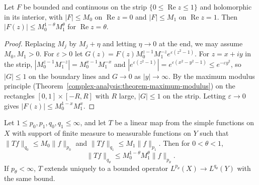\begin{lemma}\label{harmonic-analysis:lemma-three-lines}
Let $F$ be bounded and continuous on the strip $\{0 \leq \operatorname{Re}z \leq 1\}$ and holomorphic in its interior, with $|F| \leq M_0$ on $\operatorname{Re}z = 0$ and $|F| \leq M_1$ on $\operatorname{Re}z = 1$. Then
$|F(z)| \leq M_0^{1-\theta}M_1^\theta$ for $\operatorname{Re}z = \theta$.
\end{lemma}

\begin{proof}
Replacing $M_j$ by $M_j + \eta$ and letting $\eta \to 0$ at the end, we may assume $M_0, M_1 > 0$. For $\varepsilon > 0$ let $G(z) = F(z)M_0^{z-1}M_1^{-z}e^{\varepsilon(z^2 - 1)}$. For $z = x + iy$ in the strip,
$|M_0^{z-1}M_1^{-z}| = M_0^{x-1}M_1^{-x}$ and $|e^{\varepsilon(z^2 - 1)}| = e^{\varepsilon(x^2 - y^2 - 1)} \leq e^{-\varepsilon y^2}$, so $|G| \leq 1$ on the boundary lines and $G \to 0$ as $|y| \to \infty$. By the maximum
modulus principle (Theorem~\ref{complex-analysis:theorem-maximum-modulus}) on the rectangles $[0, 1] \times [-R, R]$ with $R$ large, $|G| \leq 1$ on the strip. Letting $\varepsilon \to 0$ gives
$|F(z)| \leq M_0^{1-x}M_1^x$.
\end{proof}

\begin{theorem}\label{harmonic-analysis:theorem-riesz-thorin}
Let $1 \leq p_0, p_1, q_0, q_1 \leq \infty$, and let $T$ be a linear map from the simple functions on $X$ with support of finite measure to measurable functions on $Y$ such that
$\|Tf\|_{q_0} \leq M_0\|f\|_{p_0}$ and $\|Tf\|_{q_1} \leq M_1\|f\|_{p_1}$. Then for $0 < \theta < 1$,
\[
\|Tf\|_{q_\theta} \leq M_0^{1-\theta}M_1^\theta\|f\|_{p_\theta}.
\]
If $p_\theta < \infty$, $T$ extends uniquely to a bounded operator $L^{p_\theta}(X) \to L^{q_\theta}(Y)$ with the same bound.
\end{theorem}

